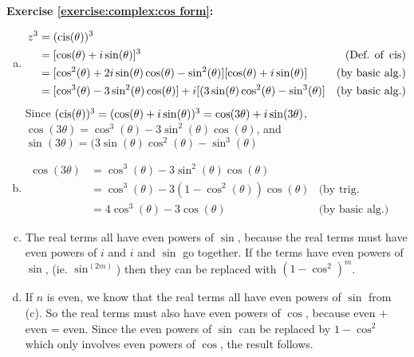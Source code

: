 \noindent\textbf{Exercise \ref{exercise:complex:cos form}:} %
\begin{enumerate}[(a)]
\item
	\begin{align*}
	z^{3}&= (\cis(\theta))^{3}&\\
	&= [\cos(\theta) + i\sin(\theta)]^{3} &\text{(Def. of}\ \cis)\\
	&= [\cos^{2}(\theta) + 2i\sin(\theta)\cos(\theta) - \sin^{2}(\theta)][\cos(\theta) + i\sin(\theta)] &	\text{(by basic alg.)}\\
	&= [\cos^{3}(\theta) - 3\sin^{2}(\theta)\cos(\theta)] + i[(3\sin(\theta)\cos^{2}(\theta) - \sin^{3}	(\theta)] &\text{(by basic alg.)}
	\end{align*}
	Since $(\operatorname{cis}(\theta))^3 = (\cos(\theta) + i\sin(\theta))^{3} = \cos(3\theta) + i\sin(3\theta)$,\\
	$\cos(3\theta) = \cos^{3}(\theta) - 3\sin^{2}(\theta)\cos(\theta)$, and\\ $\sin(3\theta) = 	(3\sin(\theta)\cos^{2}(\theta) - \sin^{3}(\theta)$

\item
	\begin{align*}
	\cos(3\theta)&= \cos^{3}(\theta) - 3\sin^{2}(\theta)\cos(\theta)&\\
	&= \cos^{3}(\theta) - 3(1-\cos^{2}(\theta))\cos(\theta)& \text{(by trig. identities)}\\
	&= 4\cos^{3}(\theta) - 3\cos(\theta)& \text{(by basic alg.)}
	\end{align*}

\item
The real terms all have even powers of $\sin$, because the real terms must have even powers of $i$ and $i$ and $\sin$ go together. If the terms have even powers of $\sin$, (ie. $\sin ^{(2m)}$) then they can be replaced with $(1-\cos^2)^m$. 

\item
If $n$ is even, we know that the real terms all have even powers of $\sin$ from (c).  So the real terms must also have even powers of $\cos$, because even + even = even.  Since the even powers of $\sin$ can be replaced by $1- \cos^2$ which only involves even powers of $\cos$, the result follows.
\end{enumerate}

